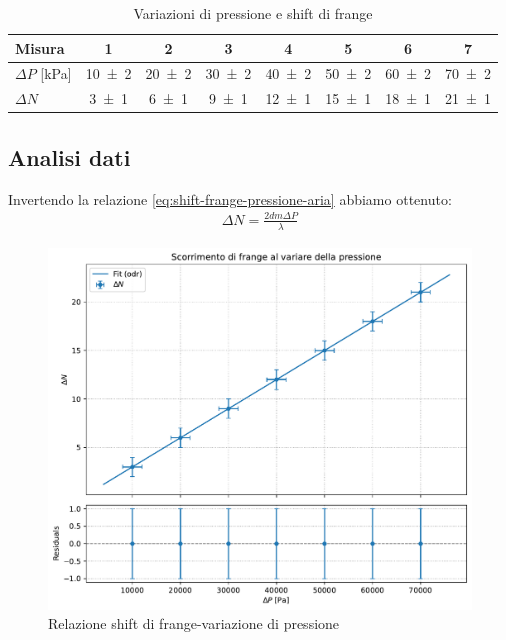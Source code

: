 \documentclass[a4paper]{article}
\begin{document}
\begin{table}[htbp]
\caption{Variazioni di pressione e shift di frange}
\label{tab:delta-p-e-delta-n}
\centering
\begin{tabular}{|l|ccccccc|}
\hline
Misura & 1 & 2 & 3 & 4 & 5 & 6 & 7 \\\hline\hline
$\Delta P$ [\si{\kilo\pascal}]& \num{10 \pm 2} & \num{20 \pm 2} & \num{30 \pm 2} & \num{40 \pm 2} & \num{50 \pm 2} & \num{60 \pm 2} & \num{70 \pm 2} \\\hline
$\Delta N$ & \num{3 \pm 1} & \num{6 \pm 1} & \num{9 \pm 1} & \num{12 \pm 1} & \num{15 \pm 1} & \num{18 \pm 1} & \num{21 \pm 1} \\\hline
\end{tabular}
\end{table}

\subsection{Analisi dati}
Invertendo la relazione \ref{eq:shift-frange-pressione-aria} abbiamo ottenuto:
\begin{align}
    \Delta N = \frac{2dm \Delta P}{\lambda}
\end{align}

\begin{figure}[htbp]
\centering
\includegraphics[width=1.0\textwidth]{./grafici/indice_aria.pdf}
\caption{Relazione shift di frange-variazione di pressione}
\label{fig:indice-aria}
\end{figure}
\end{document}
